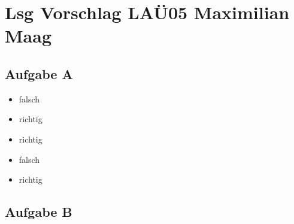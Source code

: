 \documentclass{article}
\begin{document}
	\section*{Lsg Vorschlag LAÜ05 Maximilian Maag}
	\subsection*{Aufgabe A}
	\begin{itemize}
		\item falsch
		\item richtig
		\item richtig
		\item falsch
		\item richtig
	\end{itemize}
	\subsection*{Aufgabe B}
\end{document}

